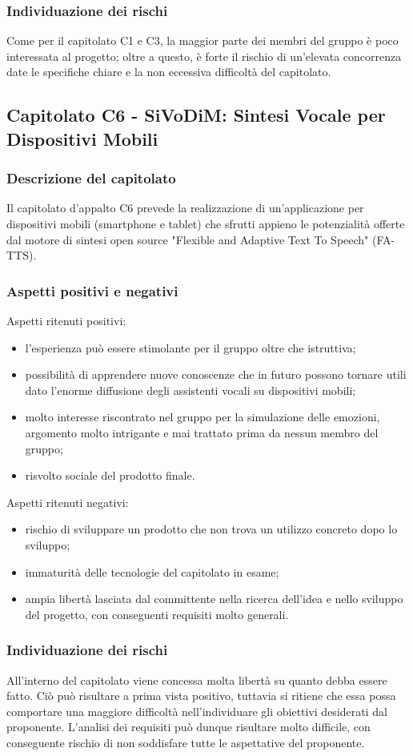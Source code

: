 \documentclass[../StudioDiFattibilita.tex]{subfiles}
\begin{document}
		\subsubsection{Individuazione dei rischi}
		Come per il capitolato C1 e C3, la maggior parte dei membri del gruppo è poco interessata al progetto; oltre a questo, è forte il rischio di un'elevata concorrenza date le specifiche chiare e la non eccessiva difficoltà del capitolato.
	\subsection{Capitolato C6 - SiVoDiM: Sintesi Vocale per Dispositivi Mobili}
		\subsubsection{Descrizione del capitolato}
		Il capitolato d'appalto C6 prevede la realizzazione di un'applicazione per dispositivi mobili (smartphone e tablet) che sfrutti appieno le potenzialità offerte dal motore di sintesi open source "Flexible and Adaptive Text To Speech" (FA-TTS).
		\subsubsection{Aspetti positivi e negativi}
		Aspetti ritenuti positivi:
			\begin{itemize}
				\item l'esperienza può essere stimolante per il gruppo oltre che istruttiva;
				\item possibilità di apprendere nuove conoscenze che in futuro possono tornare utili dato l'enorme diffusione degli assistenti vocali su dispositivi mobili;
				\item molto interesse riscontrato nel gruppo per la simulazione delle emozioni, argomento molto intrigante e mai trattato prima da nessun membro del gruppo;
				\item risvolto sociale del prodotto finale.
			\end{itemize}
		Aspetti ritenuti negativi:
			\begin{itemize}
				\item rischio di sviluppare un prodotto che non trova un utilizzo concreto dopo lo sviluppo;
				\item immaturità delle tecnologie del capitolato in esame;
				\item ampia libertà lasciata dal committente nella ricerca dell'idea e nello sviluppo del progetto, con conseguenti requisiti molto generali.
			\end{itemize}
		\subsubsection{Individuazione dei rischi}
		All'interno del capitolato viene concessa molta libertà su quanto debba essere fatto. Ciò può risultare a prima vista positivo, tuttavia si ritiene che essa possa comportare una maggiore difficoltà nell'individuare gli obiettivi desiderati dal proponente. L'analisi dei requisiti può dunque risultare molto difficile, con conseguente rischio di non soddisfare tutte le aspettative del proponente.
\end{document}
